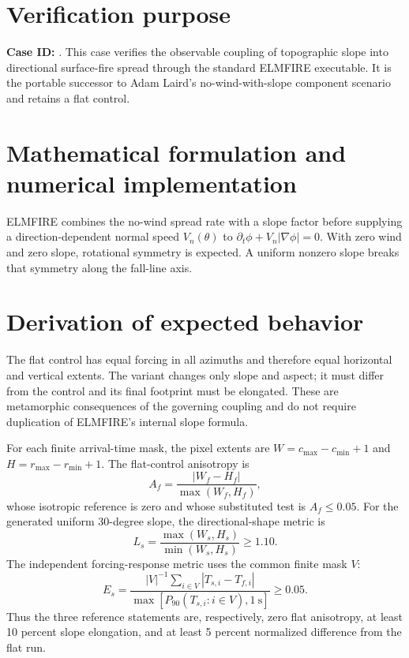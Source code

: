 \section{Verification purpose}

\textbf{Case ID:} \texttt{\CaseID}. This case verifies the observable coupling of topographic slope into directional surface-fire spread through the standard ELMFIRE executable. It is the portable successor to Adam Laird's no-wind-with-slope component scenario and retains a flat control.

\section{Mathematical formulation and numerical implementation}

ELMFIRE combines the no-wind spread rate with a slope factor before supplying a direction-dependent normal speed $V_n(\theta)$ to $\partial_t\phi+V_n|\nabla\phi|=0$. With zero wind and zero slope, rotational symmetry is expected. A uniform nonzero slope breaks that symmetry along the fall-line axis.

\section{Derivation of expected behavior}

The flat control has equal forcing in all azimuths and therefore equal horizontal and vertical extents. The \SlopeAngle{} variant changes only slope and aspect; it must differ from the control and its final footprint must be elongated. These are metamorphic consequences of the governing coupling and do not require duplication of ELMFIRE's internal slope formula.

For each finite arrival-time mask, the pixel extents are
\(W=c_{\max}-c_{\min}+1\) and \(H=r_{\max}-r_{\min}+1\).
The flat-control anisotropy is
\[
 A_f=\frac{|W_f-H_f|}{\max(W_f,H_f)},
\]
whose isotropic reference is zero and whose substituted test is
\(A_f\leq0.05\).  For the generated uniform 30-degree slope, the
directional-shape metric is
\[
 L_s=\frac{\max(W_s,H_s)}{\min(W_s,H_s)}\geq1.10.
\]
The independent forcing-response metric uses the common finite mask
\(V\):
\[
 E_s=\frac{|V|^{-1}\sum_{i\in V}|T_{s,i}-T_{f,i}|}
 {\max[P_{90}(T_{s,i}:i\in V),1~\mathrm{s}]}\geq0.05.
\]
Thus the three reference statements are, respectively, zero flat
anisotropy, at least 10 percent slope elongation, and at least 5 percent
normalized difference from the flat run.

